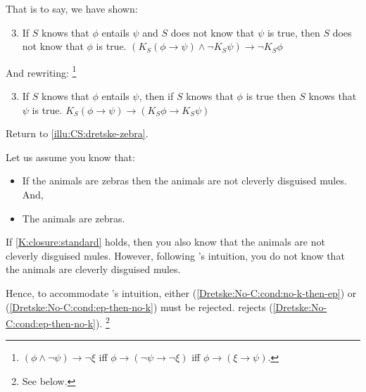 \begin{note}
  That is to say, we have shown:
  \begin{enumerate}[label=K\Alph*., ref=(K\Alph*)]
    \setcounter{enumi}{2}
  \item
    \label{K:closure:from-arg}
    If \(S\) knows that \(\phi\) entails \(\psi\) and \(S\) does not know that \(\psi\) is true, then \(S\) does not know that \(\phi\) is true.%
    \mbox{} \hfill \((K_{S}(\phi \rightarrow \psi) \land \lnot K_{S}\psi) \rightarrow \lnot K_{S}\phi\)
  \end{enumerate}
  And rewriting:\nolinebreak
  \footnote{
    \((\phi \land \lnot\psi) \rightarrow \lnot\xi\) iff \(\phi \rightarrow (\lnot\psi \rightarrow \lnot\xi)\) iff \(\phi \rightarrow (\xi \rightarrow \psi)\).
  }
  \begin{enumerate}[label=K\Alph*\('\)., ref=(K\Alph*\('\))]
    \setcounter{enumi}{2}
  \item
    \label{K:closure:standard}
    If \(S\) knows that \(\phi\) entails \(\psi\), then if \(S\) knows that \(\phi\) is true then \(S\) knows that \(\psi\) is true.%
    \mbox{} \hfill \(K_{S}(\phi \rightarrow \psi) \rightarrow (K_{S}\phi \rightarrow K_{S}\psi)\)
  \end{enumerate}
\end{note}

\begin{note}
  Return to \autoref{illu:CS:dretske-zebra}.

  Let us assume you know that:
  \begin{itemize}
  \item If the animals are zebras then the animals are not cleverly disguised mules. And,
  \item The animals are zebras.
  \end{itemize}

  If \ref{K:closure:standard} holds, then you also know that the animals are not cleverly disguised mules.
  However, following \citeauthor{Dretske:1970to}'s intuition, you do not know that the animals are cleverly disguised mules.

  Hence, to accommodate \citeauthor{Dretske:1970to}'s intuition, either (\ref{Dretske:No-C:cond:no-k-then-ep}) or (\ref{Dretske:No-C:cond:ep-then-no-k}) must be rejected.
  \citeauthor{Dretske:1970to} rejects (\ref{Dretske:No-C:cond:ep-then-no-k}).\nolinebreak
  \footnote{
    See below.
  }
\end{note}

